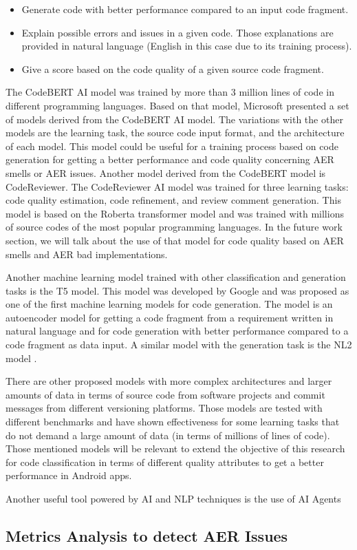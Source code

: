 \begin{itemize}
	\item Generate code with better performance compared to an input code fragment.
	\item Explain possible errors and issues in a given code. Those explanations are provided in natural language (English in this case due to its training process).
	\item Give a score based on the code quality of a given source code fragment.
\end{itemize}

The CodeBERT AI model was trained by more than 3 million lines of code in different programming languages. Based on that model, Microsoft presented a set of models derived from the CodeBERT AI model. The variations with the other models are the learning task, the source code input format, and the architecture of each model. This model could be useful for a training process based on code generation for getting a better performance and code quality concerning AER smells or AER issues.
Another model derived from the CodeBERT model is CodeReviewer. The CodeReviewer AI model was trained for three learning tasks: code quality estimation, code refinement, and review comment generation. This model is based on the Roberta transformer model and was trained with millions of source codes of the most popular programming languages. In the future work section, we will talk about the use of that model for code quality based on AER smells and AER bad implementations.


Another machine learning model trained with other classification and generation tasks is the T5 model. This model was developed by Google and was proposed as one of the first machine learning models for code generation. The model is an autoencoder model for getting a code fragment from a requirement written in natural language and for code generation with better performance compared to a code fragment as data input. A similar model with the generation task is the NL2 model \cite{nl2_model}.

There are other proposed models with more complex architectures and larger amounts of data in terms of source code from software projects and commit messages from different versioning platforms. Those models are tested with different benchmarks and have shown effectiveness for some learning tasks that do not demand a large amount of data (in terms of millions of lines of code). Those mentioned models will be relevant to extend the objective of this research for code classification in terms of different quality attributes to get a better performance in Android apps.

Another useful tool powered by AI and NLP techniques is the use of AI Agents


\subsection{Metrics Analysis to detect AER Issues}







